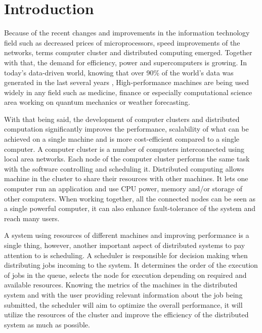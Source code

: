 \documentclass[10pt]{report}
\begin{document}

\tableofcontents

\newpage
\chapter{Introduction} \label{chap1}

Because of the recent changes and improvements in the information technology field such as decreased prices of microprocessors, speed improvements of the networks, terms computer cluster and distributed computing emerged. Together with that, the demand for efficiency, power and supercomputers is growing. In today's data-driven world, knowing that over 90\% of the world's data was generated in the last several years \cite{bigdataweb}, High-performance machines are being used widely in any field such as medicine, finance or especially computational science area working on quantum mechanics or weather forecasting.
\newline

With that being said, the development of computer clusters and distributed computation significantly improves the performance, scalability of what can be achieved on a single machine and is more cost-efficient compared to a single computer. A computer cluster is a number of computers interconnected using local area networks. Each node of the computer cluster performs the same task with the software controlling and scheduling it. Distributed computing allows machine in the cluster to share their resources with other machines. It lets one computer run an application and use CPU power, memory and/or storage of other computers. When working together, all the connected nodes can be seen as a single powerful computer, it can also enhance fault-tolerance of the system and reach many users.
\newline

A system using resources of different machines and improving performance is a single thing, however, another important aspect of distributed systems to pay attention to is scheduling. A scheduler is responsible for decision making when distributing jobs incoming to the system. It determines the order of the execution of jobs in the queue, selects the node for execution depending on required and available resources. Knowing the metrics of the machines in the distributed system and with the user providing relevant information about the job being submitted, the scheduler will aim to optimize the overall performance, it will utilize the resources of the cluster and improve the efficiency of the distributed system as much as possible.
\end{document}

